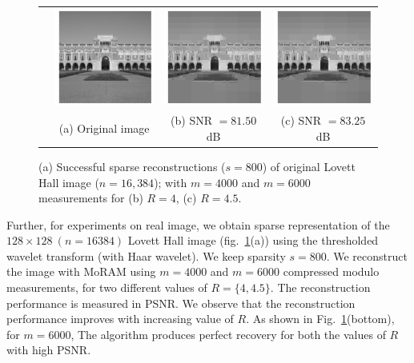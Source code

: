 \begin{figure}[t!]
\begin{center}
\begin{tabular}{cccc}
			\rotatebox{90}{$~~~~~~~m=6000$} &
			\includegraphics[width=0.32\linewidth]{./fig/lovett_original.pdf} &
			\includegraphics[width=0.32\linewidth]{./fig/lovett_r4_m_6000_s_800.pdf} & 
			\includegraphics[width=0.32\linewidth]{./fig/lovett_r450_m_6000_s_800.pdf}  \\
			& \small{(a) Original image} & \small{(b) SNR $=81.50$dB} & %
			\small{(c) SNR $=83.25$dB} \\
		\end{tabular}
	\end{center}
	\caption{{(a) Successful sparse reconstructions ($s=800$) of original Lovett Hall image ($n=16,384$); with $m=4000$ and $m=6000$ measurements for (b) $R=4$, (c) $R=4.5$.}}
	\label{fig:lovett}
\end{figure}

Further, for experiments on real image, we obtain sparse representation of the $128 \times 128~(n=16384)$ Lovett Hall image (fig.~\ref{fig:lovett}(a)) using the thresholded wavelet transform (with Haar wavelet). We keep sparsity $s = 800$. We reconstruct the image with MoRAM using $m = 4000$ and $m=6000$ compressed modulo measurements, for two different values of $R =\{4,4.5\}$. The reconstruction performance is measured in PSNR. We observe that the reconstruction performance improves with increasing value of $R$. As shown in Fig.~\ref{fig:lovett}(bottom), for $m=6000$, The algorithm produces perfect recovery for both the values of $R$ with high PSNR.
%


